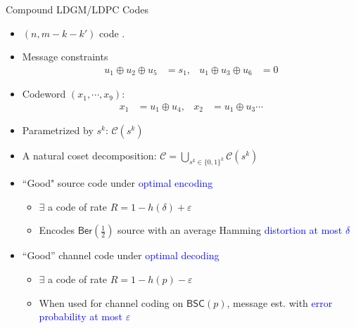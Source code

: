 \documentclass{beamer}
\newlength{\onecolwid}
\newlength{\itemspace}
\begin{document}
\begin{frame}
\begin{columns}[t]
\begin{column}{\onecolwid}
    \vspace{2cm}
    \begin{block}{\Large Compound LDGM/LDPC Codes}
    \begin{center}
      \scalebox{2}{}
    \end{center}
        \begin{itemize}
    \item  $(n,m-k-k')$ code .
    \item Message constraints \vspace{-0.2cm}
      \begin{align*}
        u_1\oplus u_2 \oplus u_5&=s_1, &  u_1\oplus u_3 \oplus u_6&=0
      \end{align*}
    \item Codeword $(x_1,\cdots,x_9)$: \vspace{-0.2cm}
      \begin{align*}
        x_1 &= u_1 \oplus u_4, & x_2 &= u_1\oplus u_3 \cdots
      \end{align*}
    \item Parametrized by $s^k$: $\mathcal{C}(s^k)$
    \item\vspace{\itemspace} A natural coset decomposition: $\mathcal{C}=\bigcup_{s^k \in \{0,1\}^k} \mathcal{C}(s^k)$
        \item\vspace{\itemspace} ``Good" source code under \textcolor{blue}{optimal encoding}
     \begin{itemize}
     \item $\exists$ a code of rate $R=1-h(\delta)+\varepsilon$ 
     \item Encodes $\mathsf{Ber}(\tfrac{1}{2})$ source with an average Hamming \textcolor{blue}{distortion at most $\delta$}
     \end{itemize}
     
       \item\vspace{\itemspace}  ``Good'' channel code under \textcolor{blue}{optimal decoding}
    \begin{itemize}
    \item $\exists$ a code of rate $R=1-h(p)-\varepsilon$
    \item When used for channel coding on $\mathsf{BSC}(p)$, message est. with \textcolor{blue}{error probability at most $\varepsilon$}
    \end{itemize}            
    \end{itemize}
  \end{block}
  \end{column}


\end{columns}
\end{frame}
\end{document}
